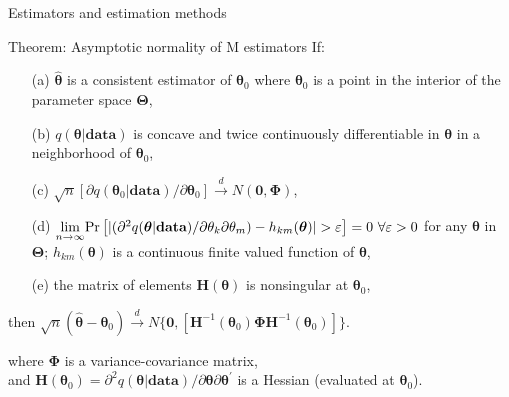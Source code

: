 \documentclass{beamer}
\begin{document}
\begin{frame}{Estimators and estimation methods}
\small 
\begin{block}{Theorem: Asymptotic normality of M estimators}
If:
\begin{itemize}
    \item[(a)] $\hat{\bm{\theta}}$ is a consistent estimator of $\bm{\theta}_0$ where $\bm{\theta}_0$ is a point in the interior of the parameter space $\bm{\Theta}$,
    \smallskip 
    \item[(b)] $q(\bm{\theta}|\textbf{data})$ is concave and twice continuously differentiable in $\bm{\theta}$ in a neighborhood of $\bm{\theta}_0$,  
    \smallskip 
    \item[(c)] $\sqrt{n} \left[ \partial q(\bm{\theta}_0|\textbf{data})/ \partial \bm{\theta}_0 \right] \xrightarrow{~~d~~} N(\bm{0},\bm{\Phi})$,  
    \smallskip 
    \item[(d)] $\underset{n \rightarrow \infty}{\lim} \textnormal{Pr} \left[ |(\partial^2 q(\bm{\theta}|\textbf{data})/ \partial \theta_k \partial \theta_m)- h_{km}(\bm{\theta}) | >\varepsilon \right] = 0~ \forall \varepsilon > 0$ for any $\bm{\theta}$ in $\bm{\Theta}$; $h_{km}(\bm{\theta})$ is a continuous finite valued function of $\bm{\theta}$,
    \smallskip 
    \item[(e)] the matrix of elements $\bm{H}(\bm{\theta})$ is nonsingular at $\bm{\theta}_0$,
\end{itemize}
\smallskip then $\sqrt{n} (\hat{\bm{\theta}} - \bm{\theta}_0) \xrightarrow{~~d~~} N \lbrace \bm{0},[ \bm{H}^{-1}(\bm{\theta}_0)\bm{\Phi}\bm{H}^{-1}(\bm{\theta}_0)] \rbrace$. 
\end{block}
where $\bm{\Phi}$ is a variance-covariance matrix,   \\and $\bm{H}(\bm{\theta}_0)=\partial^2 q(\bm{\theta}|\textbf{data})/ \partial \bm{\theta} \partial \bm{\theta}^{\prime}$ is a Hessian (evaluated at $\bm{\theta}_0$).
\end{frame}
\end{document}
